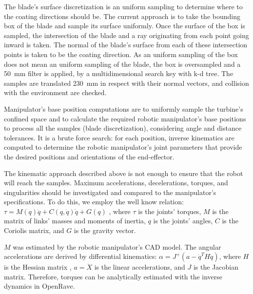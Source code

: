 The blade's surface discretization is an uniform sampling to
determine where to the coating directions should be. The current approach is to
take the bounding box of the blade and sample its surface uniformly. Once the
surface of the box is sampled, the intersection of the blade and a ray
originating from each point going inward is taken. The normal of the blade's
surface from each of these intersection points is taken to be the coating
direction. As an uniform sampling of the box does not mean an uniform sampling
of the blade, the box is oversampled and a 50~mm filter is applied, by a multidimensional search key with k-d tree.
The samples are translated 230~mm in respect with their normal vectors,
and collision with the environment are checked. 

Manipulator's base position computations are to uniformly sample the turbine's
confined space and to calculate the required robotic manipulator's base
positions to process all the samples (blade discretization),  considering angle
and distance tolerances. It is a brute force search: for each position, inverse
kinematics are computed to determine the robotic manipulator's joint parameters that provide
the desired positions and orientations of the end-effector.

The kinematic approach described above is not enough to ensure that the robot
will reach the samples. Maximum accelerations, decelerations,
torques, and singularities should be investigated and compared to the
manipulator's specifications. To do this, we employ the well know relation:
$\tau = M(q)\ddot{q} + C(q,\dot{q})\dot{q} + G(q)$
\cite{sciavicco2000differential}, where $\tau$ is the joints' torques, $M$ is
the matrix of links' masses and moments of inertia, $q$ is the joints' angles,
$C$ is the Coriolis matrix, and $G$ is the gravity vector.

$M$ was estimated by the robotic manipulator's CAD model. The angular
accelerations are derived by differential kinematics:
$\alpha=J^+(a-\dot{q}^TH\dot{q})$, where $H$ is the Hessian matrix
\cite{hourtash2005kinematic}, $a=\ddot{X}$ is the linear accelerations, and $J$
is the Jacobian matrix. Therefore, torques can be analytically estimated with
the inverse dynamics in OpenRave.

